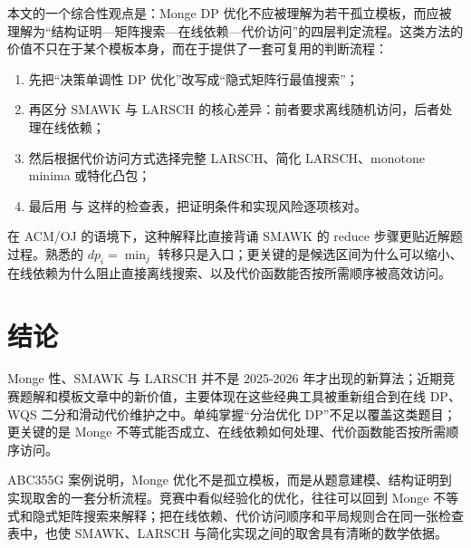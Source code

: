 \documentclass[lang=cn,a4paper,newtx,code=minted,bibtex]{elegantpaper}
\begin{document}
本文的一个综合性观点是：Monge DP 优化不应被理解为若干孤立模板，而应被理解为“结构证明—矩阵搜索—在线依赖—代价访问”的四层判定流程。这类方法的价值不只在于某个模板本身，而在于提供了一套可复用的判断流程：
\begin{enumerate}[(1)]
  \item 先把“决策单调性 DP 优化”改写成“隐式矩阵行最值搜索”；
  \item 再区分 SMAWK 与 LARSCH 的核心差异：前者要求离线随机访问，后者处理在线依赖；
  \item 然后根据代价访问方式选择完整 LARSCH、简化 LARSCH、monotone minima 或特化凸包；
  \item 最后用  与  这样的检查表，把证明条件和实现风险逐项核对。
\end{enumerate}

在 ACM/OJ 的语境下，这种解释比直接背诵 SMAWK 的 reduce 步骤更贴近解题过程。熟悉的 $dp_i=\min_j$ 转移只是入口；更关键的是候选区间为什么可以缩小、在线依赖为什么阻止直接离线搜索、以及代价函数能否按所需顺序被高效访问。


\section{结论}

Monge 性、SMAWK 与 LARSCH 并不是 2025-2026 年才出现的新算法；近期竞赛题解和模板文章中的新价值，主要体现在这些经典工具被重新组合到在线 DP、WQS 二分和滑动代价维护之中。单纯掌握“分治优化 DP”不足以覆盖这类题目；更关键的是 Monge 不等式能否成立、在线依赖如何处理、代价函数能否按所需顺序访问。

ABC355G 案例说明，Monge 优化不是孤立模板，而是从题意建模、结构证明到实现取舍的一套分析流程。竞赛中看似经验化的优化，往往可以回到 Monge 不等式和隐式矩阵搜索来解释；把在线依赖、代价访问顺序和平局规则合在同一张检查表中，也使 SMAWK、LARSCH 与简化实现之间的取舍具有清晰的数学依据。

\clearpage
\printbibliography[heading=bibintoc, title=\ebibname]
\end{document}
